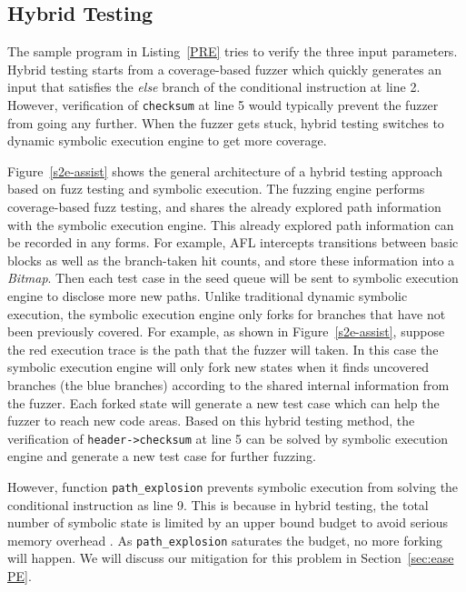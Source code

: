 \subsection{Hybrid Testing}

The sample program in Listing~\ref{PRE} tries to verify the three input
parameters. Hybrid testing starts from a coverage-based fuzzer which
quickly generates an input that satisfies the \textit{else} branch
of the conditional instruction at line 2. However, verification of
\texttt{checksum} at line 5 would typically prevent the fuzzer from
going any further. When the fuzzer gets stuck, hybrid testing switches to
dynamic symbolic execution engine to get more coverage.



Figure~\ref{s2e-assist} shows the general architecture of a hybrid testing
approach based on fuzz testing and symbolic execution. The fuzzing engine 
performs coverage-based fuzz testing, and shares the already explored 
path information with the symbolic execution engine. This already explored 
path information can be recorded in any forms. For example, AFL 
intercepts transitions between basic blocks as well as the branch-taken 
hit counts, and store these information into a \textit{Bitmap}.
Then each test case in the seed queue will be sent to symbolic execution 
engine to disclose more new paths.
Unlike traditional dynamic symbolic execution, the symbolic execution engine
only forks for branches that have not been previously covered. For
example, as shown in Figure~\ref{s2e-assist}, suppose the red execution
trace is the path that the fuzzer will taken. In this case the symbolic
execution engine will only fork new states when it finds uncovered
branches (the blue branches) according to the shared internal
information from the fuzzer. Each forked state will generate a new test
case which can help the fuzzer to reach new code areas. Based on this
hybrid testing method, the verification of \texttt{header->checksum} at
line 5 can be solved by symbolic execution engine and generate a new
test case for further fuzzing.

However, function \texttt{path\_explosion} prevents symbolic execution
from solving the conditional instruction as line 9. This is because in
hybrid testing, the total number of symbolic state is limited by an
upper bound budget to avoid serious memory overhead
\cite{stephens2016driller}. As \texttt{path\_explosion} saturates the
budget, no more forking will happen.  We will discuss our mitigation
for this problem in Section~\ref{sec:ease PE}.

